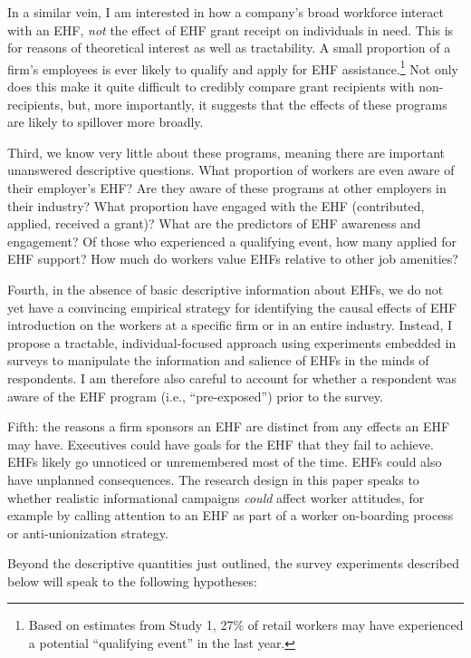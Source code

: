 \documentclass[
  11pt,
  oneside]{article}
\begin{document}
In a similar vein, I am interested in how a company's broad workforce interact with an EHF, \emph{not} the effect of EHF grant receipt on individuals in need. This is for reasons of theoretical interest as well as tractability. A small proportion of a firm's employees is ever likely to qualify and apply for EHF assistance.\footnote{Based on estimates from Study 1, 27\% of retail workers may have experienced a potential ``qualifying event'' in the last year.} Not only does this make it quite difficult to credibly compare grant recipients with non-recipients, but, more importantly, it suggests that the effects of these programs are likely to spillover more broadly.

Third, we know very little about these programs, meaning there are important unanswered descriptive questions. What proportion of workers are even aware of their employer's EHF? Are they aware of these programs at other employers in their industry? What proportion have engaged with the EHF (contributed, applied, received a grant)? What are the predictors of EHF awareness and engagement? Of those who experienced a qualifying event, how many applied for EHF support? How much do workers value EHFs relative to other job amenities?

Fourth, in the absence of basic descriptive information about EHFs, we do not yet have a convincing empirical strategy for identifying the causal effects of EHF introduction on the workers at a specific firm or in an entire industry. Instead, I propose a tractable, individual-focused approach using experiments embedded in surveys to manipulate the information and salience of EHFs in the minds of respondents. I am therefore also careful to account for whether a respondent was aware of the EHF program (i.e., ``pre-exposed'') prior to the survey.

Fifth: the reasons a firm sponsors an EHF are distinct from any effects an EHF may have. Executives could have goals for the EHF that they fail to achieve. EHFs likely go unnoticed or unremembered most of the time. EHFs could also have unplanned consequences. The research design in this paper speaks to whether realistic informational campaigns \emph{could} affect worker attitudes, for example by calling attention to an EHF as part of a worker on-boarding process or anti-unionization strategy.

Beyond the descriptive quantities just outlined, the survey experiments described below will speak to the following hypotheses:
\end{document}
